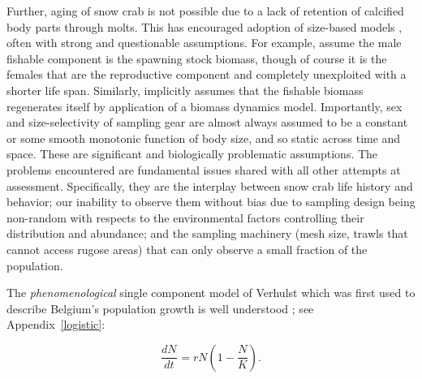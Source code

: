 \documentclass[
	letterpaper, %
	10pt, %
]{article}
\begin{document}
Further, aging of snow crab is not possible due to a lack of retention
of calcified body parts through molts. This has encouraged adoption
of size-based models \cite{Siddeek_et_al_2009, Cadigan_et_al_2017, Ianelli_et_al_2022},
often with strong and questionable assumptions. For example, \cite{Siddeek_et_al_2009}
assume the male fishable component is the spawning stock biomass,
though of course it is the females that are the reproductive component
and completely unexploited with a shorter life span. Similarly, \cite{Choi_Zisserson_2011} implicitly assumes that the fishable biomass regenerates itself by application
of a biomass dynamics model. Importantly, sex and size-selectivity
of sampling gear are almost always assumed to be a constant or some
smooth monotonic function of body size, and so static across time
and space. These are significant and biologically problematic assumptions.
The problems encountered are fundamental
issues shared with all other attempts at assessment. Specifically, they are the interplay between snow crab life history and behavior; our inability to observe them without bias
due to sampling design being non-random with respects to the environmental
factors controlling their distribution and abundance; and the sampling
machinery (mesh size, trawls that cannot access rugose areas) that
can only observe a small fraction of the population.
 

The \emph{phenomenological} single component model of Verhulst which
was first used to describe Belgium's population growth is well understood
\cite{Verhulst_1845, Bacaër_2011}; see Appendix~\ref{logistic}:

\begin{equation}
	\frac{\mathit{dN}}{\mathit{dt}}_{}=\mathit{rN}{({1-\frac{N}{K}})}.
\end{equation}
\end{document}

